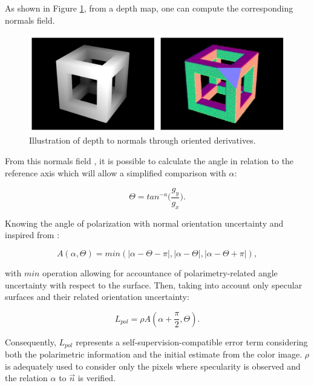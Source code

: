 As shown in Figure \ref{fig:normalsfromcube}, from a depth map, one can compute the corresponding normals field.

\begin{figure}[h]
	\centering
	\includegraphics[width=0.8\linewidth]{Figures/Fusion/normalsfromcube}
	\caption[Illustration of depth to normals through oriented derivatives.]{Illustration of depth to normals through oriented derivatives.}
	\label{fig:normalsfromcube}
\end{figure}

From this normals field , it is possible to calculate the angle in relation to the reference axis which will allow a simplified comparison with $\alpha$:

\begin{equation}\label{ntoa}
	\Theta = tan^{-a}\Big( \frac{g_y}{g_x} \Big).
\end{equation}

Knowing the angle of polarization with normal orientation uncertainty and inspired from \cite{cui2017polarimetric}:

\begin{equation}
	A (\alpha, \Theta) = min(|\alpha - \Theta - \pi| , |\alpha - \Theta| , |\alpha  - \Theta + \pi|),
\end{equation}

with $min$ operation allowing for accountance of polarimetry-related angle uncertainty with respect to the surface.
Then, taking into account only specular surfaces and their related orientation uncertainty:

\begin{equation}\label{regu}
	L_{pol} = \rho A(\alpha + \frac{\pi}{2} , \Theta).
\end{equation}

Consequently, $L_{pol}$ represents a self-supervision-compatible error term considering both the polarimetric information and the initial estimate from the color image. $\rho$ is adequately used to consider only the pixels where specularity is observed and the relation $\alpha$ to $\vec{n}$ is verified.


